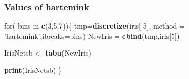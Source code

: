 \documentclass[]{article}
\newenvironment{Shaded}{\begin{snugshade}}{\end{snugshade}}
\newcommand{\KeywordTok}[1]{\textcolor[rgb]{0.13,0.29,0.53}{\textbf{{#1}}}}
\newcommand{\DataTypeTok}[1]{\textcolor[rgb]{0.13,0.29,0.53}{{#1}}}
\newcommand{\DecValTok}[1]{\textcolor[rgb]{0.00,0.00,0.81}{{#1}}}
\newcommand{\StringTok}[1]{\textcolor[rgb]{0.31,0.60,0.02}{{#1}}}
\newcommand{\NormalTok}[1]{{#1}}
\begin{document}
\subsubsection{Values of hartemink}\label{values-of-hartemink}

\begin{Shaded}
\begin{Highlighting}[]
\NormalTok{for( bins in }\KeywordTok{c}\NormalTok{(}\DecValTok{3}\NormalTok{,}\DecValTok{5}\NormalTok{,}\DecValTok{7}\NormalTok{))\{}
\NormalTok{tmp=}\KeywordTok{discretize}\NormalTok{(iris[-}\DecValTok{5}\NormalTok{], }\DataTypeTok{method =} \StringTok{'hartemink'}\NormalTok{,}\DataTypeTok{ibreaks=}\NormalTok{bins) }
\NormalTok{NewIris =}\StringTok{ }\KeywordTok{cbind}\NormalTok{(tmp,iris[}\DecValTok{5}\NormalTok{]) }

\NormalTok{IrisNetsb <-}\StringTok{ }\KeywordTok{tabu}\NormalTok{(NewIris)}

\KeywordTok{print}\NormalTok{(IrisNetsb)}
\NormalTok{\}}
\end{Highlighting}
\end{Shaded}
\end{document}
